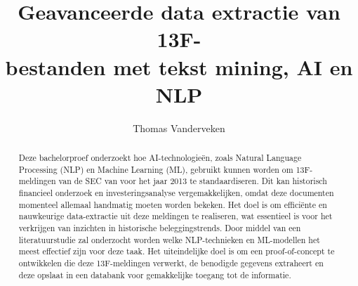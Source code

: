\documentclass{hogent-article}
\title{Geavanceerde data extractie van 13F-\\bestanden met tekst mining, AI en NLP}
\author{Thomas Vanderveken}
\begin{document}
\begin{abstract}
Deze bachelorproef onderzoekt hoe AI-technologieën, zoals Natural Language Processing (NLP) en Machine Learning (ML), gebruikt kunnen worden om 13F-meldingen van de SEC van voor het jaar 2013 te standaardiseren. Dit kan historisch financieel onderzoek en investeringsanalyse vergemakkelijken, omdat deze documenten momenteel allemaal handmatig moeten worden bekeken. Het doel is om efficiënte en nauwkeurige data-extractie uit deze meldingen te realiseren, wat essentieel is voor het verkrijgen van inzichten in historische beleggingstrends. Door middel van een literatuurstudie zal onderzocht worden welke NLP-technieken en ML-modellen het meest effectief zijn voor deze taak. Het uiteindelijke doel is om een proof-of-concept te ontwikkelen die deze 13F-meldingen verwerkt, de benodigde gegevens extraheert en deze opslaat in een databank voor gemakkelijke toegang tot de informatie.
\end{abstract}

\tableofcontents



\printbibliography[heading=bibintoc]
\end{document}
